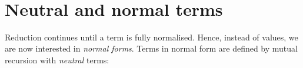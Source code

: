 \begin{fence}
\begin{code}
\\
%
\>[8]%
\>[474I]\AgdaSpace{}%
\AgdaSpace{}%
\<%
\\
\>[.][@{}l@{}]\<[474I]%
\>[10]\AgdaComment{---------}\<%
\\
%
\>[8]\AgdaSpace{}%
\AgdaSpace{}%
\AgdaSpace{}%
\<%
\\
\>[0]\AgdaOperator{\AgdaFunction{\AgdaUnderscore{}[\AgdaUnderscore{}]}}\AgdaSpace{}%
\AgdaSymbol{\{}\AgdaSymbol{\}}\AgdaSpace{}%
\AgdaSymbol{\{}\AgdaSymbol{\}}\AgdaSpace{}%
\AgdaSymbol{\{}\AgdaSymbol{\}}\AgdaSpace{}%
\AgdaSpace{}%
\AgdaSpace{}%
\AgdaSymbol{=}%
\>[24]\AgdaSpace{}%
\AgdaSymbol{\{}\AgdaSpace{}%
\AgdaOperator{\AgdaInductiveConstructor{,}}\AgdaSpace{}%
\AgdaSymbol{\}}\AgdaSpace{}%
\AgdaSymbol{\{}\AgdaSymbol{\}}\AgdaSpace{}%
\AgdaSymbol{(}\AgdaSpace{}%
\AgdaSymbol{)}\AgdaSpace{}%
\AgdaSymbol{\{}\AgdaSymbol{\}}\AgdaSpace{}%
\<%
\end{code}
\end{fence}

\hypertarget{neutral-and-normal-terms}{%
\section{Neutral and normal terms}\label{neutral-and-normal-terms}}

Reduction continues until a term is fully normalised. Hence, instead of
values, we are now interested in \emph{normal forms}. Terms in normal
form are defined by mutual recursion with \emph{neutral} terms:

\begin{fence}
\begin{code}%
\>[0]\AgdaSpace{}%
\AgdaSpace{}%
\AgdaSymbol{:}\AgdaSpace{}%
\AgdaSpace{}%
\AgdaSymbol{\{}\AgdaSpace{}%
\AgdaSymbol{\}}\AgdaSpace{}%
\AgdaSpace{}%
\AgdaSpace{}%
\AgdaSpace{}%
\AgdaSpace{}%
\AgdaSpace{}%
\<%
\\
\>[0]\AgdaSpace{}%
%
\>[13]\AgdaSymbol{:}\AgdaSpace{}%
\AgdaSpace{}%
\AgdaSymbol{\{}\AgdaSpace{}%
\AgdaSymbol{\}}\AgdaSpace{}%
\AgdaSpace{}%
\AgdaSpace{}%
\AgdaSpace{}%
\AgdaSpace{}%
\AgdaSpace{}%
\<%
\end{code}
\end{fence}


